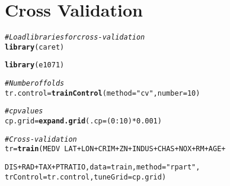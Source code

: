 \documentclass[11pt, a4paper]{article}\usepackage[]{graphicx}\usepackage[]{color}
\makeatletter
\newcommand{\hlstr}[1]{\textcolor[rgb]{0.192,0.494,0.8}{#1}}%
\newcommand{\hlcom}[1]{\textcolor[rgb]{0.678,0.584,0.686}{\textit{#1}}}%
\newcommand{\hlkwd}[1]{\textcolor[rgb]{0.737,0.353,0.396}{\textbf{#1}}}%
\newenvironment{kframe}{%
 \def\at@end@of@kframe{}%
 \ifinner\ifhmode%
  \def\at@end@of@kframe{\end{minipage}}%
  \begin{minipage}{\columnwidth}%
 \fi\fi%
 \def\FrameCommand##1{\hskip\@totalleftmargin \hskip-\fboxsep
 \colorbox{shadecolor}{##1}\hskip-\fboxsep
     \hskip-\linewidth \hskip-\@totalleftmargin \hskip\columnwidth}%
 \MakeFramed {\advance\hsize-\width
   \@totalleftmargin\z@ \linewidth\hsize
   \@setminipage}}%
 {\par\unskip\endMakeFramed%
 \at@end@of@kframe}
\newenvironment{knitrout}{}{} %
\makeatother
\begin{document}
\section{Cross Validation}
\begin{knitrout}
\color{fgcolor}\begin{kframe}
\begin{alltt}
\hlcom{# Load libraries for cross-validation}
\hlkwd{library}(caret)
\end{alltt}


{\ttfamily\noindent\itshape\color{messagecolor}{\#\# Loading required package: cluster\\\#\# Loading required package: foreach\\\#\# Loading required package: lattice\\\#\# Loading required package: plyr\\\#\# Loading required package: reshape2}}\begin{alltt}
\hlkwd{library}(e1071)
\end{alltt}


{\ttfamily\noindent\itshape\color{messagecolor}{\#\# Loading required package: class}}\begin{alltt}

\hlcom{# Number of folds}
tr.control = \hlkwd{trainControl}(method = \hlstr{"cv"}, number = 10)

\hlcom{# cp values}
cp.grid = \hlkwd{expand.grid}( .cp = (0:10)*0.001)

\hlcom{# Cross-validation}
tr = \hlkwd{train}(MEDV ~ LAT + LON + CRIM + ZN + INDUS + CHAS + NOX + RM + AGE + 
             
             DIS + RAD + TAX + PTRATIO, data = train, method = \hlstr{"rpart"}, 
           trControl = tr.control, tuneGrid = cp.grid)
\end{alltt}



\end{kframe}
\end{knitrout}
\end{document}
